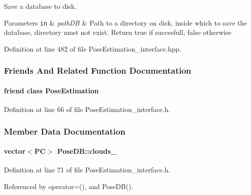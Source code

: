 Save a database to disk. 


\begin{DoxyParams}[1]{Parameters}
\mbox{\tt in}  & {\em path\-D\-B} & Path to a directory on disk, inside which to save the database, directory must not exist. Return true if succesfull, false otherwise \\
\hline
\end{DoxyParams}


Definition at line 482 of file Pose\-Estimation\-\_\-interface.\-hpp.



\subsubsection{Friends And Related Function Documentation}
\hypertarget{classPoseDB_acc93828d970ba58835be2e8221c7a669}{
\paragraph[{Pose\-Estimation}]{\setlength{\rightskip}{0pt plus 5cm}friend class {\bf Pose\-Estimation}\hspace{0.3cm}{\ttfamily [friend]}}}\label{classPoseDB_acc93828d970ba58835be2e8221c7a669}


Definition at line 66 of file Pose\-Estimation\-\_\-interface.\-h.



\subsubsection{Member Data Documentation}
\hypertarget{classPoseDB_a6c324c00cf5ce2d6370567891170ba68}{
\paragraph[{clouds\-\_\-}]{\setlength{\rightskip}{0pt plus 5cm}vector$<${\bf P\-C}$>$ Pose\-D\-B\-::clouds\-\_\-\hspace{0.3cm}{\ttfamily [private]}}}\label{classPoseDB_a6c324c00cf5ce2d6370567891170ba68}


Definition at line 71 of file Pose\-Estimation\-\_\-interface.\-h.



Referenced by operator=(), and Pose\-D\-B().

